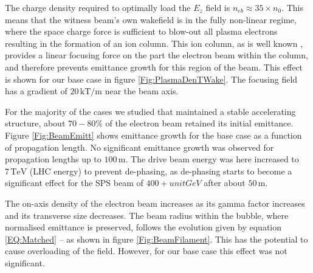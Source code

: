 \documentclass[aps,prstab,reprint,amsmath,amssymb,groupedaddress]{revtex4-1}
\newcommand{\unit}[1]{\,\mathrm{#1}}
\begin{document}
The charge density required to optimally load the $E_{z}$ field is $n_{eb} \approx 35\times n_{0}$. This means that the
witness beam's own wakefield is in the fully non-linear regime, where the space charge force is sufficient to blow-out
all plasma electrons resulting in the formation of an ion column. This ion column, as is well known
\cite{rosenzweig:1991}, provides a linear focusing force on the part the electron beam within the column, and therefore
prevents emittance growth for this region of the beam. This effect is shown for our base case in figure
\ref{Fig:PlasmaDenTWake}. The focusing field has a gradient of $20\unit{kT/m}$ near the beam axis.



For the majority of the cases we studied that maintained a stable accelerating structure, about $70-80\%$ of the
electron beam retained its initial emittance. Figure \ref{Fig:BeamEmitt} shows emittance growth for the base case as a
function of propagation length. No significant emittance growth was observed for propagation lengths up to
$100\unit{m}$. The drive beam energy was here increased to $7\unit{TeV}$ (LHC energy) to prevent de-phasing, as
de-phasing starts to become a significant effect for the SPS beam of $400+unit{GeV}$ after about $50\unit{m}$.

The on-axis density of the electron beam increases as its gamma factor increases and its transverse size decreases. The
beam radius within the bubble, where normalised emittance is preserved, follows the evolution given by equation
\ref{EQ:Matched} -- as shown in figure \ref{Fig:BeamFilament}. This has the potential to cause overloading of the field.
However, for our base case this effect was not significant.
\end{document}

